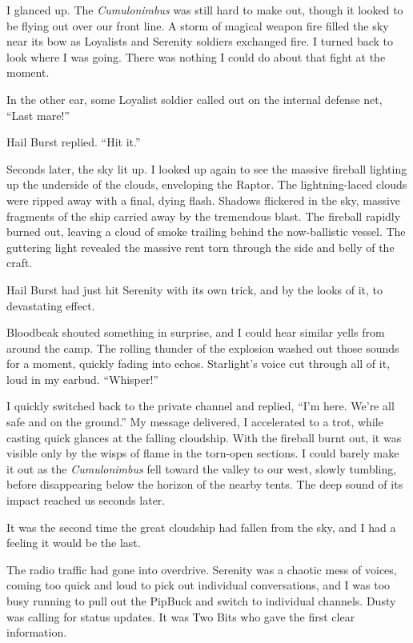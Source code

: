 I glanced up. The \textit{Cumulonimbus} was still hard to make out, though it looked to be flying out over our front line. A storm of magical weapon fire filled the sky near its bow as Loyalists and Serenity soldiers exchanged fire. I turned back to look where I was going. There was nothing I could do about that fight at the moment.

In the other ear, some Loyalist soldier called out on the internal defense net, “Last mare!”

Hail Burst replied. “Hit it.”

Seconds later, the sky lit up. I looked up again to see the massive fireball lighting up the underside of the clouds, enveloping the Raptor. The lightning-laced clouds were ripped away with a final, dying flash. Shadows flickered in the sky, massive fragments of the ship carried away by the tremendous blast. The fireball rapidly burned out, leaving a cloud of smoke trailing behind the now-ballistic vessel. The guttering light revealed the massive rent torn through the side and belly of the craft.

Hail Burst had just hit Serenity with its own trick, and by the looks of it, to devastating effect.

Bloodbeak shouted something in surprise, and I could hear similar yells from around the camp. The rolling thunder of the explosion washed out those sounds for a moment, quickly fading into echos. Starlight’s voice cut through all of it, loud in my earbud. “Whisper!”

I quickly switched back to the private channel and replied, “I’m here. We’re all safe and on the ground.” My message delivered, I accelerated to a trot, while casting quick glances at the falling cloudship. With the fireball burnt out, it was visible only by the wisps of flame in the torn-open sections. I could barely make it out as the \textit{Cumulonimbus} fell toward the valley to our west, slowly tumbling, before disappearing below the horizon of the nearby tents. The deep sound of its impact reached us seconds later.

It was the second time the great cloudship had fallen from the sky, and I had a feeling it would be the last.

The radio traffic had gone into overdrive. Serenity was a chaotic mess of voices, coming too quick and loud to pick out individual conversations, and I was too busy running to pull out the PipBuck and switch to individual channels. Dusty was calling for status updates. It was Two Bits who gave the first clear information.

